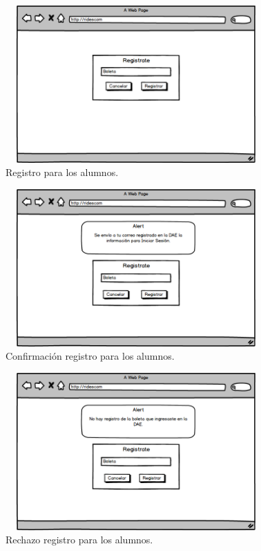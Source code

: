 	\begin{figure}[hbt!]
		\centering
		\includegraphics[width=10cm, height=6cm]{Imagenes/Disenos/VistasBorradas/p1_Registro.png}
		\caption{Registro para los alumnos.}
	\end{figure}
	
	\begin{figure}[hbt!]
		\centering
		\includegraphics[width=10cm, height=6cm]{Imagenes/Disenos/VistasBorradas/ConfirmacionRegistro.png}
		\caption{Confirmación registro para los alumnos.}
	\end{figure}
	
	\begin{figure}[hbt!]
		\centering
		\includegraphics[width=10cm, height=6cm]{Imagenes/Disenos/VistasBorradas/p3RechazoRegistro.png}
		\caption{Rechazo registro para los alumnos.}
	\end{figure}

